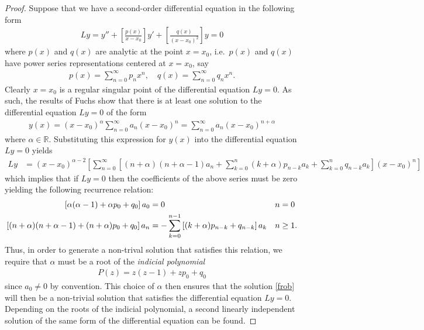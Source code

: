\documentclass[12pt]{article}
\theoremstyle{definition}
\begin{document}
\begin{proof}
  Suppose that we have a second-order differential equation in the following
  form
  \begin{align}\label{form}
    Ly = y'' + \left[\frac{p(x)}{x-x_0}\right]y' + \left[\frac{q(x)}{(x-x_0)^2}\right]y = 0
  \end{align}
  where $p(x)$ and $q(x)$ are analytic at the point $x=x_0$, i.e.\ $p(x)$ and $q(x)$ have power series representations centered at $x=x_0$, say
  \begin{align*}
    p(x) = \sum_{n=0}^\infty p_n x^n, \quad     q(x) = \sum_{n=0}^\infty q_n x^n.
  \end{align*}
  Clearly $x=x_0$ is a regular singular point of the differential equation $Ly = 0$. As such, the results of Fuchs show that there is at least one solution to the
  differential equation $Ly = 0$ of the form
  \begin{align}\label{frob}
    y(x) = (x-x_0)^\alpha \sum_{n=0}^\infty a_n (x-x_0)^n =   \sum_{n=0}^\infty a_n (x-x_0)^{n+\alpha}
  \end{align}
  where $\alpha\in\mathbb{R}$. Substituting this expression for $y(x)$ into the differential equation $Ly=0$ yields
  \begin{align*}
    Ly &= (x-x_0)^{\alpha-2}\left[\sum_{n=0}^\infty\left[(n+\alpha)(n+\alpha-1)a_n + \sum_{k=0}^n(k+\alpha)p_{n-k}a_k + \sum_{k=0}^nq_{n-k}a_k\right](x-x_0)^n \right]
  \end{align*}
  which implies that if $Ly=0$ then the coefficients of the above series must be zero yielding the following recurrence relation:
  \begin{align}\label{rel}
    \left[\alpha(\alpha-1)+ \alpha p_{0} + q_{0}\right] a_0&= 0 &n &=0 \notag \\
    \left[(n+\alpha)(n+\alpha-1) + (n+\alpha)p_0 +q_0\right] a_n &= - \sum_{k=0}^{n-1}\left[(k+\alpha)p_{n-k} + q_{n-k}\right]a_k  &n &\geq 1.
  \end{align}
  Thus, in order to generate a non-trival solution that satisfies this relation,
  we require that $\alpha$ must be a root of the \emph{indicial polynomial}
  \begin{align*}
    P(z) = z(z-1)+ z p_{0} + q_{0}
  \end{align*}
  since $a_0 \neq 0$ by convention.
  This choice of $\alpha$ then ensures that the solution \eqref{frob} will then be a non-trivial solution that satisfies the differential equation $Ly=0$.
  Depending on the roots of the indicial polynomial, a second linearly independent solution of the same form of the differential equation can be found.


\end{proof}
\end{document}
